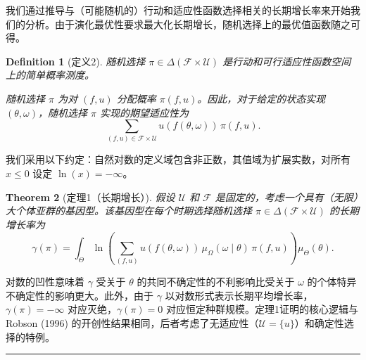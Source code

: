 \documentclass[12pt,a4paper]{article}
\newenvironment{translation}
  {\par\noindent\color{blue!70!black}\smallskip}
  {\par\medskip\hrule\medskip}
\newtheorem{theorem}{Theorem}[section]
\newtheorem{definition}[theorem]{Definition}
\begin{document}
\begin{translation}
我们通过推导与（可能随机的）行动和适应性函数选择相关的长期增长率来开始我们的分析。由于演化最优性要求最大化长期增长，随机选择上的最优值函数随之可得。

\begin{definition}[定义2]
随机选择 $\pi \in \Delta(\mathcal{F} \times \mathcal{U})$ 是行动和可行适应性函数空间上的简单概率测度。

随机选择 $\pi$ 为对 $(f, u)$ 分配概率 $\pi(f, u)$。因此，对于给定的状态实现 $(\theta, \omega)$，随机选择 $\pi$ 实现的期望适应性为
\[
\sum_{(f,u) \in \mathcal{F} \times \mathcal{U}} u(f(\theta, \omega)) \, \pi(f, u).
\]
\end{definition}

我们采用以下约定：自然对数的定义域包含非正数，其值域为扩展实数，对所有 $x \leq 0$ 设定 $\ln(x) = -\infty$。

\begin{theorem}[定理1（长期增长）]
假设 $\mathcal{U}$ 和 $\mathcal{F}$ 是固定的，考虑一个具有（无限）大个体亚群的基因型。该基因型在每个时期选择随机选择 $\pi \in \Delta(\mathcal{F} \times \mathcal{U})$ 的长期增长率为
\begin{equation}\label{eq:1}
\gamma(\pi) = \int_{\Theta} \ln\!\left( \sum_{(f,u)} u(f(\theta, \omega)) \, \mu_\Omega(\omega \mid \theta) \, \pi(f, u) \right) \mu_\Theta(\theta).
\end{equation}
\end{theorem}

对数的凹性意味着 $\gamma$ 受关于 $\theta$ 的共同不确定性的不利影响比受关于 $\omega$ 的个体特异不确定性的影响更大。此外，由于 $\gamma$ 以对数形式表示长期平均增长率，$\gamma(\pi) = -\infty$ 对应灭绝，$\gamma(\pi) = 0$ 对应恒定种群规模。定理1证明的核心逻辑与 Robson (1996) 的开创性结果相同，后者考虑了无适应性（$\mathcal{U} = \{u\}$）和确定性选择的特例。
\end{translation}
\end{document}
